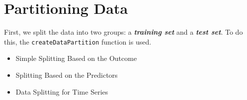 

\section{Partitioning Data}
First, we split the data into two groups: a \textbf{\textit{training set}} and a \textbf{\textit{test set}}. 
To do this, the \texttt{createDataPartition}
function is used.

\begin{itemize}
\item Simple Splitting Based on the Outcome
\item Splitting Based on the Predictors
\item Data Splitting for Time Series
\end{itemize}


